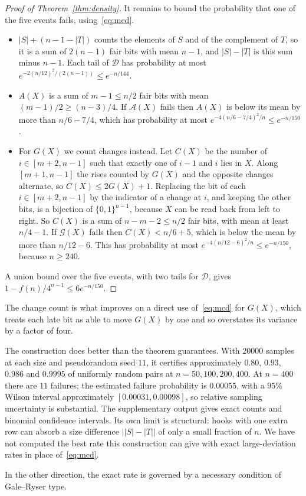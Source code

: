 \documentclass[12pt]{article}
\numberwithin{theorem}{section}
\numberwithin{equation}{section}
\begin{document}
\begin{proof}[Proof of Theorem~\ref{thm:density}]
It remains to bound the probability that one of the five events fails, using~\eqref{eq:mcd}.
\begin{itemize}
\item $|S|+(n-1-|T|)$ counts the elements of $S$ and of the complement of $T$, so it is a sum of $2(n-1)$
fair bits with mean $n-1$, and $|S|-|T|$ is this sum minus $n-1$. Each tail of $\mathcal{D}$ has probability
at most $e^{-2(n/12)^2/(2(n-1))}\le e^{-n/144}$.
\item $A(X)$ is a sum of $m-1\le n/2$ fair bits with mean $(m-1)/2\ge(n-3)/4$. If $\mathcal{A}(X)$ fails then
$A(X)$ is below its mean by more than $n/6-7/4$, which has probability at most
$e^{-4(n/6-7/4)^2/n}\le e^{-n/150}$.
\item For $G(X)$ we count changes instead. Let $C(X)$ be the number of $i\in[m+2,n-1]$ such that exactly one of
$i-1$ and $i$ lies in $X$. Along $[m+1,n-1]$ the rises counted by $G(X)$ and the opposite changes alternate, so
$C(X)\le2G(X)+1$. Replacing the bit of each $i\in[m+2,n-1]$ by the indicator of a change at $i$, and keeping the
other bits, is a bijection of $\{0,1\}^{n-1}$, because $X$ can be read back from left to right. So $C(X)$ is a
sum of $n-m-2\le n/2$ fair bits, with mean at least $n/4-1$. If $\mathcal{G}(X)$ fails then $C(X)<n/6+5$, which
is below the mean by more than $n/12-6$. This has probability at most $e^{-4(n/12-6)^2/n}\le e^{-n/150}$,
because $n\ge240$.
\end{itemize}
A union bound over the five events, with two tails for $\mathcal{D}$, gives
$1-f(n)/4^{n-1}\le6e^{-n/150}$.
\end{proof}

The change count is what improves on a direct use of~\eqref{eq:mcd} for $G(X)$, which treats each late bit as
able to move $G(X)$ by one and so overstates its variance by a factor of four.

\begin{remark}\label{rem:rate}
The construction does better than the theorem guarantees. With $20000$ samples at each size and pseudorandom seed $11$, it
certifies approximately $0.80$, $0.93$, $0.986$ and $0.9995$ of uniformly random pairs at $n=50,100,200,400$.
At $n=400$ there are $11$ failures; the estimated failure probability is $0.00055$, with a $95\%$ Wilson interval approximately $[0.00031,0.00098]$, so relative sampling uncertainty is substantial. The supplementary output gives exact counts and
binomial confidence intervals. Its own limit is structural: hooks with one extra row can absorb a size
difference $\bigl||S|-|T|\bigr|$ of only a small fraction of $n$. We have not computed the best rate this construction can give with exact large-deviation rates in place
of~\eqref{eq:mcd}.

In the other direction, the exact rate is governed by a necessary condition of Gale--Ryser type.

\end{remark}
\end{document}
